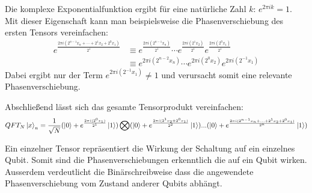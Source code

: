 Die komplexe Exponentialfunktion ergibt für eine natürliche Zahl \(k\): \(e^{2\pi i k} = 1\).
Mit dieser Eigenschaft kann man beispielsweise die Phasenverschiebung des ersten Tensors vereinfachen:
\begin{align*} 
  e^{\frac{2 \pi i (2^{n-1}x_n+ \dotsb +2^1x_2+2^0x_1)}{2^1}}
  &\equiv
  e^{\frac{2 \pi i (2^{n-1}x_n)}{2^1}} \dotsb e^{\frac{2 \pi i (2^1x_2)}{2^1}} e^{\frac{2 \pi i (2^0x_1)}{2^1}} \\
  &\equiv 
  e^{{2 \pi i (2^{n-2}x_n)}} \dotsb e^{{2 \pi i (2^0x_2)}} e^{{2 \pi i (2^{-1}x_1)}}
\end{align*}
Dabei ergibt nur der Term \(e^{{2 \pi i (2^{-1}x_1)}} \neq 1 \)  
und verursacht somit eine relevante Phasenverschiebung.

Abschließend lässt sich das gesamte Tensorprodukt vereinfachen:
\[QFT_{N}\ket{x}_{n} = \frac{1}{\sqrt{N}}(\ket{0} + { e^{\frac{2 \pi i (2^0x_1)}{2^1}}}\ket{1}) \bigotimes
( \ket{0} + { e^{\frac{2 \pi i (2^1x_2+2^0x_1)}{2^2}}}\ket{1})...
( \ket{0} + { e^{\frac{2 \pi i (2^{n-1}x_n+ ... +2^1x_2+2^0x_1)}{2^n}}}\ket{1})\]

Ein einzelner Tensor repräsentiert die Wirkung der Schaltung auf ein einzelnes Qubit.
Somit sind die Phasenverschiebungen erkenntlich die auf ein Qubit wirken.
Ausserdem verdeutlicht die Binärschreibweise dass die angewendete Phasenverschiebung vom Zustand anderer Qubits abhängt.


